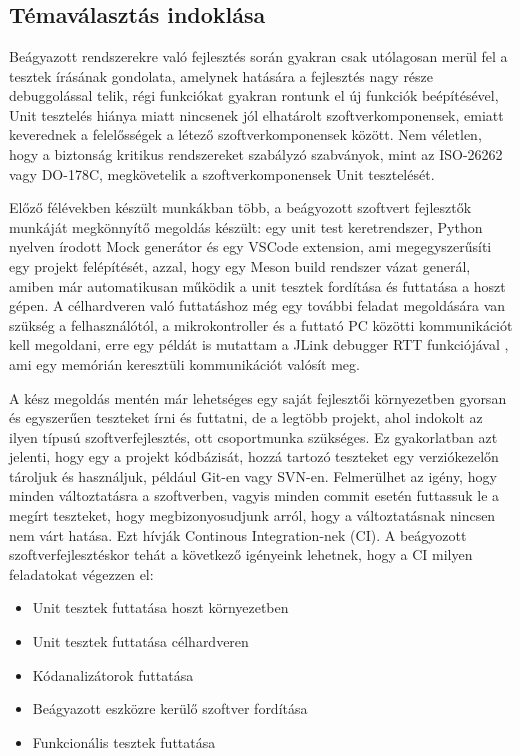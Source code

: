 \chapter{\bevezetes}

\section*{Témaválasztás indoklása}

Beágyazott rendszerekre való fejlesztés során gyakran csak utólagosan merül fel a tesztek írásának gondolata, amelynek hatására a fejlesztés nagy része debuggolással telik, régi funkciókat gyakran rontunk el új funkciók beépítésével, Unit tesztelés hiánya miatt nincsenek jól elhatárolt szoftverkomponensek, emiatt keverednek a felelősségek a létező szoftverkomponensek között. Nem véletlen, hogy a biztonság kritikus rendszereket szabályzó szabványok, mint az ISO-26262 vagy DO-178C, megkövetelik a szoftverkomponensek Unit tesztelését. \cite{Szakdolgozat} 

Előző félévekben készült munkákban több, a beágyozott szoftvert fejlesztők munkáját megkönnyítő megoldás készült: egy unit test keretrendszer, Python nyelven írodott Mock generátor és egy VSCode extension, ami megegyszerűsíti egy projekt felépítését, azzal, hogy egy Meson build rendszer vázat generál, amiben már automatikusan működik a unit tesztek fordítása és futtatása a hoszt gépen. A célhardveren való futtatáshoz még egy további feladat megoldására van szükség a felhasználótól, a mikrokontroller és a futtató PC közötti kommunikációt kell megoldani, erre egy példát is mutattam a JLink debugger RTT funkciójával \cite{SeggerRTT}, ami egy memórián keresztüli kommunikációt valósít meg.

A kész megoldás mentén már lehetséges egy saját fejlesztői környezetben gyorsan és egyszerűen teszteket írni és futtatni, de a legtöbb projekt, ahol indokolt az ilyen típusú szoftverfejlesztés, ott csoportmunka szükséges. Ez gyakorlatban azt jelenti, hogy egy a projekt kódbázisát, hozzá tartozó teszteket egy verziókezelőn tároljuk és használjuk, például Git-en vagy SVN-en. Felmerülhet az igény, hogy minden változtatásra a szoftverben, vagyis minden commit esetén futtassuk le a megírt teszteket, hogy megbizonyosudjunk arról, hogy a változtatásnak nincsen nem várt hatása. Ezt hívják Continous Integration-nek (CI). A beágyozott szoftverfejlesztéskor tehát a következő igényeink lehetnek, hogy a CI milyen feladatokat végezzen el:
\begin{itemize}
	\item Unit tesztek futtatása hoszt környezetben
	\item Unit tesztek futtatása célhardveren
	\item Kódanalizátorok futtatása
	\item Beágyazott eszközre kerülő szoftver fordítása
	\item Funkcionális tesztek futtatása
\end{itemize}

